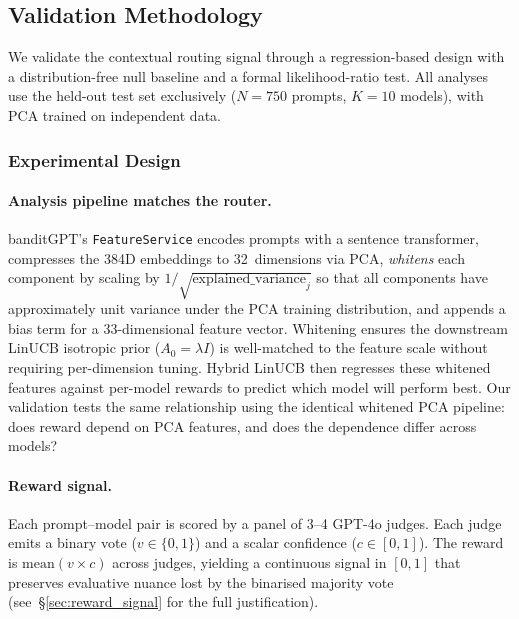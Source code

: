 
\subsection{Validation Methodology}
\label{sec:validation_methodology}

We validate the contextual routing signal through a regression-based
design with a distribution-free null baseline and a formal
likelihood-ratio test.  All analyses use the held-out test set
exclusively ($N{=}750$ prompts, $K{=}10$ models), with PCA trained on
independent data.

\subsubsection{Experimental Design}

\paragraph{Analysis pipeline matches the router.}
banditGPT's \texttt{FeatureService} encodes prompts with a sentence
transformer, compresses the 384D embeddings to 32~dimensions via PCA,
\emph{whitens} each component by scaling by $1/\sqrt{\text{explained\_variance}_j}$
so that all components have approximately unit variance under the PCA
training distribution, and appends a bias term for a 33-dimensional
feature vector.  Whitening ensures the downstream LinUCB isotropic prior
($A_0 = \lambda I$) is well-matched to the feature scale without
requiring per-dimension tuning.  Hybrid LinUCB then regresses these
whitened features against per-model rewards to predict which model will
perform best.  Our validation tests the same relationship using the
identical whitened PCA pipeline: does reward depend on PCA features,
and does the dependence differ across models?

\paragraph{Reward signal.}
Each prompt--model pair is scored by a panel of 3--4 GPT-4o judges.
Each judge emits a binary vote ($v \in \{0,1\}$) and a scalar confidence
($c \in [0,1]$).  The reward is $\text{mean}(v \times c)$ across judges,
yielding a continuous signal in $[0,1]$ that preserves evaluative nuance
lost by the binarised majority vote (see~\S\ref{sec:reward_signal} for
the full justification).

